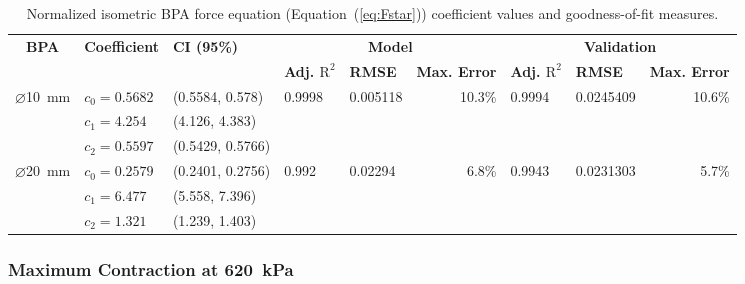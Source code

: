 \begin{table}
\vspace{1.5em}
\caption{Normalized isometric BPA force equation (Equation~(\ref{eq:Fstar})) coefficient values and goodness-of-fit measures.}
\label{tab:Fstar}
\begin{tabular}{@{}cllrrrrrr@{}}
\toprule
\multirow{2}{*}{\textbf{BPA}} &
  \multirow{2}{*}{\textbf{Coefficient}} &
  \multirow{2}{*}{\textbf{CI (95\%)}} &
  \multicolumn{3}{c}{\textbf{Model}} &
  \multicolumn{3}{c}{\textbf{Validation}} \\ 
& & &
  \multicolumn{1}{l}{\textbf{Adj. $\text{R}^2$}} &
  \multicolumn{1}{l}{\textbf{RMSE}} &
  \textbf{Max. Error} &
  \multicolumn{1}{l}{\textbf{Adj. $\text{R}^2$}} &
  \multicolumn{1}{l}{\textbf{RMSE}} &
  \textbf{Max. Error} \\ \midrule
\multirow{3}{*}{$\diameter$\qty{10}{\mm}} &
  $c_0 = 0.5682$ & (0.5584, 0.578) &
  \multicolumn{1}{l}{\multirow{3}{*}{0.9998}} &
  \multicolumn{1}{l}{\multirow{3}{*}{0.005118}} &
  \multirow{3}{*}{10.3\%} &
  \multicolumn{1}{l}{\multirow{3}{*}{0.9994}} &
  \multicolumn{1}{l}{\multirow{3}{*}{0.0245409}} &
  \multirow{3}{*}{10.6\%} \\ \cmidrule{2-3}
& $c_1 = 4.254$ & (4.126, 4.383) &
  \multicolumn{1}{l}{} & \multicolumn{1}{l}{} & &
  \multicolumn{1}{l}{} & \multicolumn{1}{l}{} & \\ \cmidrule{2-3}
& $c_2 = 0.5597$ & (0.5429, 0.5766) &
  \multicolumn{1}{l}{} & \multicolumn{1}{l}{} & &
  \multicolumn{1}{l}{} & \multicolumn{1}{l}{} & \\ \midrule
\multirow{3}{*}{$\diameter$\qty{20}{\mm}} &
  $c_0 = 0.2579$ & (0.2401, 0.2756) &
  \multicolumn{1}{l}{\multirow{3}{*}{0.992}} &
  \multicolumn{1}{l}{\multirow{3}{*}{0.02294}} &
  \multirow{3}{*}{6.8\%} &
  \multicolumn{1}{l}{\multirow{3}{*}{0.9943}} &
  \multicolumn{1}{l}{\multirow{3}{*}{0.0231303}} &
  \multirow{3}{*}{5.7\%} \\ \cmidrule{2-3}
& $c_1 = 6.477$ & (5.558, 7.396) &
  \multicolumn{1}{l}{} & \multicolumn{1}{l}{} & &
  \multicolumn{1}{l}{} & \multicolumn{1}{l}{} & \\ \cmidrule{2-3}
& $c_2 = 1.321$ & (1.239, 1.403) &
\multicolumn{1}{l}{} & \multicolumn{1}{l}{} & &
\multicolumn{1}{l}{} & \multicolumn{1}{l}{} & \\ \bottomrule
\end{tabular}

\endgroup
\end{table}



\subsubsection{Maximum Contraction at \qty{620}{\kPa}}

